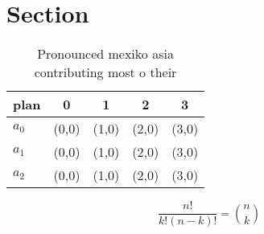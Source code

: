 \documentclass[a4paper]{article}
\begin{document}
\section{Section}

\begin{table}
\begin{adjustbox}{width=0.6\columnwidth}
\begin{tabular}{|l|l|l|l|l|}
\hline
\textbf{plan} & \multicolumn{1}{c|}{\textbf{0}} & \multicolumn{1}{c|}{\textbf{1}} & \multicolumn{1}{c|}{\textbf{2}} & \multicolumn{1}{c|}{\textbf{3}} \\ \hline
\textbf{$a_0$}  & (0,0) & (1,0) & (2,0) & (3,0) \\ \hline
\textbf{$a_1$}  & (0,0) & (1,0) & (2,0) & (3,0) \\ \hline
\textbf{$a_2$}  & (0,0) & (1,0) & (2,0) & (3,0) \\ \hline
\end{tabular}
\end{adjustbox}
\caption{Pronounced mexiko asia contributing most o their 
}
\end{table}

\[ \frac{n!}{k!(n-k)!} = \binom{n}{k} \]
\end{document}
